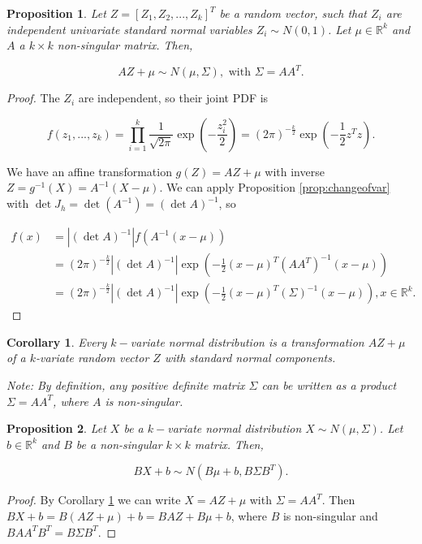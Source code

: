 \documentclass{book}
\theoremstyle{plain}%
\newtheorem{corollary}{Corollary}[section]
\newtheorem{proposition}{Proposition}[section]
\theoremstyle{definition}
\begin{document}
\begin{proposition}
Let $Z = [Z_1, Z_2,...,Z_k]^T$ be a random vector, such that $Z_i$ are independent univariate standard normal variables $Z_i \sim N(0,1)$. Let $\mu \in \mathbb{R}^k$ and $A$ a $k \times k$ non-singular matrix. Then,

$$AZ + \mu \sim N(\mu, \Sigma), \text{ with } \Sigma = AA^T.$$
\end{proposition}

\begin{proof}
The $Z_i$ are independent, so their joint PDF is

$$f(z_1,...,z_k) = \prod_{i=1}^k \frac{1}{\sqrt{2\pi}}\exp(-\frac{z_i^2}{2}) = (2\pi)^{-\frac{k}{2}}\exp(-\frac{1}{2}z^Tz).$$

We have an affine transformation $g(Z) = AZ + \mu$ with inverse $Z = g^{-1}(X) = A^{-1}(X - \mu)$. We can apply Proposition \ref{prop:changeofvar} with $\det J_h = \det (A^{-1}) = (\det A)^{-1}$, so

\begin{align*}
f(x) &= |(\det A)^{-1}|f(A^{-1}(x - \mu))\\
&= (2\pi)^{-\frac{k}{2}}|(\det A)^{-1}|\exp\left(-\frac{1}{2}(x - \mu)^T(AA^T)^{-1}(x - \mu)\right)\\
&= (2\pi)^{-\frac{k}{2}}|(\det A)^{-1}|\exp\left(-\frac{1}{2}(x - \mu)^T(\Sigma)^{-1}(x - \mu)\right), x \in \mathbb{R}^k.
\end{align*}

\end{proof}

\begin{corollary}
Every $k-$variate normal distribution is a transformation $AZ + \mu$ of a $k$-variate random vector $Z$ with standard normal components. 

Note: By definition, any positive definite matrix $\Sigma$ can be written as a product $\Sigma = AA^T$, where $A$ is non-singular.\label{cor:mvn}
\end{corollary}

\begin{proposition}
Let $X$ be a $k-$variate normal distribution $X \sim N(\mu, \Sigma)$. Let $b \in \mathbb{R}^k$ and $B$ be a non-singular $k \times k$ matrix. Then,

$$BX + b \sim N(B\mu + b, B\Sigma B^T).$$
\end{proposition}

\begin{proof}
By Corollary \ref{cor:mvn} we can write $X = AZ + \mu$ with $\Sigma = AA^T$. Then $BX + b = B(AZ + \mu) + b = BAZ + B\mu + b$, where $B$ is non-singular and $BAA^TB^T = B\Sigma B^T$.
\end{proof}
\end{document}
